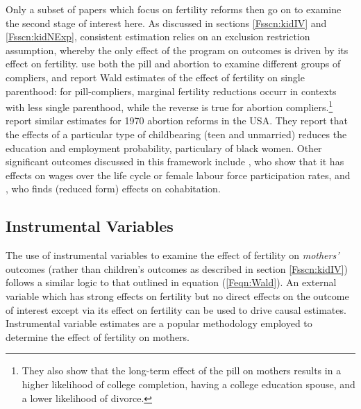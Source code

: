 Only a subset of papers which focus on fertility reforms then go on to examine
the second stage of interest here.  As discussed in sections \ref{Fsscn:kidIV} 
and \ref{Fsscn:kidNExp}, consistent estimation relies on an exclusion restriction
assumption, whereby the only effect of the program on outcomes is driven by
its effect on fertility. \citet{OltmansHungerman2012} use both the pill and
abortion to examine different groups of compliers, and report Wald estimates
of the effect of fertility on single parenthood: for pill-compliers, marginal
fertility reductions occurr in contexts with less single parenthood, while the
reverse is true for abortion compliers.\footnote{They also show that the 
long-term effect of the pill on mothers results in a higher likelihood of college 
completion, having a college education spouse, and a lower likelihood of 
divorce.} \citet{AngristEvans1996} report similar estimates for 1970 abortion 
reforms in the USA.  They report that the effects of a particular type of 
childbearing (teen and unmarried) reduces the education and employment 
probability, particulary of black women.  Other significant outcomes discussed 
in this framework include \citet{Baileyetal2012,Bailey2006,Bailey2013}, who 
show that it has effects on wages over the life cycle or female labour force 
participation rates, and \citet{Christensen2012}, who finds (reduced form) 
effects on cohabitation.

\subsection{Instrumental Variables}
The use of instrumental variables to examine the effect of fertility on 
\emph{mothers'} outcomes (rather than children's outcomes as described
in section \ref{Fsscn:kidIV}) follows a similar logic to that outlined in
equation (\ref{Feqn:Wald}).  An external variable which has strong effects
on fertility but no direct effects on the outcome of interest except via its
effect on fertility can be used to drive causal estimates.  Instrumental 
variable estimates are a popular methodology employed to determine the 
effect of fertility on mothers.

